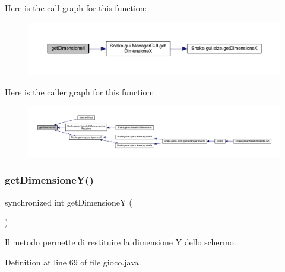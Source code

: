 Here is the call graph for this function\+:
\nopagebreak
\begin{figure}[H]
\begin{center}
\leavevmode
\includegraphics[width=350pt]{class_snake_1_1game_1_1gioco_ad74e7d47d7a1a055b993ccebbc684c08_cgraph}
\end{center}
\end{figure}
Here is the caller graph for this function\+:
\nopagebreak
\begin{figure}[H]
\begin{center}
\leavevmode
\includegraphics[width=350pt]{class_snake_1_1game_1_1gioco_ad74e7d47d7a1a055b993ccebbc684c08_icgraph}
\end{center}
\end{figure}
\mbox{\label{class_snake_1_1game_1_1gioco_abd35efad25c3e2eb4a53c1a7e2b11d71}} 
\subsubsection{\texorpdfstring{get\+Dimensione\+Y()}{getDimensioneY()}}
{\footnotesize\ttfamily synchronized int get\+DimensioneY (\begin{DoxyParamCaption}{ }\end{DoxyParamCaption})}



Il metodo permette di restituire la dimensione Y dello schermo. 



Definition at line 69 of file gioco.\+java.

